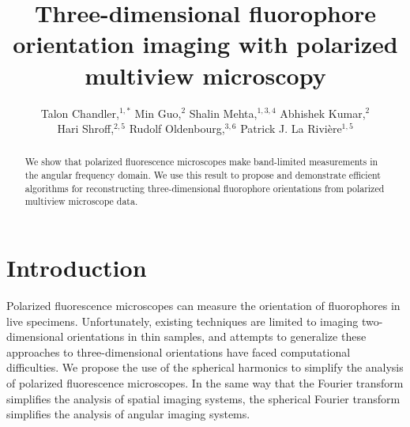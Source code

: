 \documentclass[letterpaper,10pt]{article}
\begin{document}
\title{Three-dimensional fluorophore orientation imaging with polarized multiview microscopy}

\author{Talon Chandler,${}^{1,*}$ Min Guo,${}^2$ Shalin Mehta,${}^{1,3,4}$ Abhishek Kumar,${}^2$\\ Hari Shroff,${}^{2,5}$ Rudolf Oldenbourg,${}^{3,6}$ Patrick J. La Rivi\`ere${}^{1,5}$}

\address{${}^1$Department of Radiology, University of Chicago, Chicago, Illinois 60637, USA.\\ ${}^2$Section on High Resolution Optical Imaging, National Institute of Biomedical Imaging\\ and Bioengineering, National Institutes of Health, Bethesda, Maryland 20892, USA.\\ ${}^3$Bell Center, Marine Biological Laboratory, Woods Hole, Massachusetts 02543, USA.\\ ${}^4$(present address) Chan Zuckerberg Biohub, San Francisco, California 94158, USA.\\ ${}^5$Whitman Center, Marine Biological Laboratory, Woods Hole, Massachusetts 02543, USA.\\ ${}^6$Department of Physics, Brown University, Providence, Rhode Island 02912, USA.}

\begin{abstract}
  \hspace{-0.75em} We show that polarized fluorescence microscopes make band-limited measurements
  in the angular frequency domain. We use this result to propose and demonstrate
  efficient algorithms for reconstructing three-dimensional fluorophore
  orientations from polarized multiview microscope data.
\end{abstract}


\section{Introduction}
Polarized fluorescence microscopes can measure the orientation of fluorophores
in live specimens\cite{weiss1999}. Unfortunately, existing techniques are
limited to imaging two-dimensional orientations in thin samples, and attempts to
generalize these approaches to three-dimensional orientations have faced
computational difficulties. We propose the use of the spherical harmonics to
simplify the analysis of polarized fluorescence microscopes. In the same way
that the Fourier transform simplifies the analysis of spatial imaging systems,
the spherical Fourier transform simplifies the analysis of angular imaging
systems.
\end{document}
